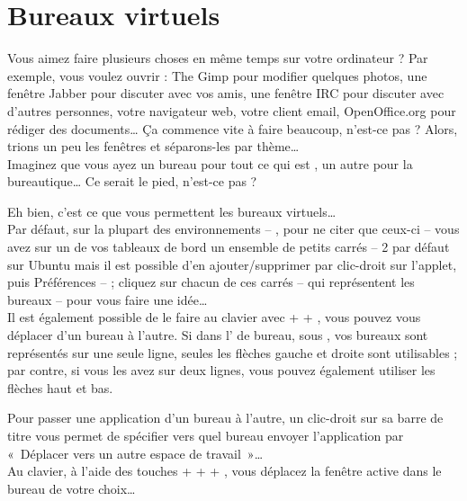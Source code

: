 \section{Bureaux virtuels}
\label{RefBureauxVirtuels}
Vous aimez faire plusieurs choses en même temps sur votre ordinateur ? Par exemple, vous voulez ouvrir : The Gimp pour modifier quelques photos, une fenêtre Jabber pour discuter avec vos amis, une fenêtre IRC pour discuter avec d'autres personnes, votre navigateur web, votre client email, OpenOffice.org pour rédiger des documents\ldots{} Ça commence vite à faire beaucoup, n'est-ce pas ?
Alors, trions un peu les fenêtres et séparons-les par thème\ldots{}\\
Imaginez que vous ayez un bureau pour tout ce qui est , un autre pour la bureautique… Ce serait le pied, n'est-ce pas ?\par
Eh bien, c'est ce que vous permettent les bureaux virtuels…\\
Par défaut, sur la plupart des environnements -- ,  pour ne citer que ceux-ci -- vous avez sur un de vos tableaux de bord un ensemble de petits carrés -- 2 par défaut sur Ubuntu mais il est possible d'en ajouter/supprimer par clic-droit sur l'applet, puis Préférences -- ; cliquez sur chacun de ces carrés -- qui représentent les bureaux -- pour vous faire une idée…\\
Il est également possible de le faire au clavier  avec  +  + , vous pouvez vous déplacer d'un bureau à l'autre.
Si dans l' de bureau, sous , vos bureaux sont représentés sur une seule ligne, seules les flèches gauche et droite sont utilisables ; par contre, si vous les avez sur deux lignes, vous pouvez également utiliser les flèches haut et bas.\par
Pour passer une application d'un bureau à l'autre, un clic-droit sur sa barre de titre vous permet de spécifier vers quel bureau envoyer l'application par «~Déplacer vers un autre espace de travail~»\ldots{}\\
Au clavier, à l'aide des touches  +  +  + , vous déplacez la fenêtre active dans le bureau de votre choix\ldots{}
